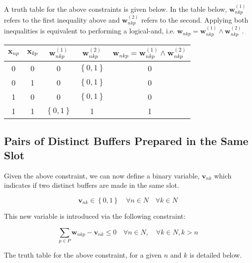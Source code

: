 A truth table for the above constraints is given below.
In the table below, $\boldsymbol{w}_{nkp}^{\left( 1 \right)}$ refers to the 
first inequality above and $\boldsymbol{w}_{nkp}^{\left( 2 \right)}$ refers to
the second.  Applying both inequalities is equivalent to performing a
logical-and, i.e. 
$\boldsymbol{w}_{nkp} = \boldsymbol{w}_{nkp}^{\left( 1 \right)} \land
\boldsymbol{w}_{nkp}^{\left( 2 \right)}$.

\begin{center}
    \begin{tabular}{c c | c c | c}
        $\boldsymbol{x}_{np}$ & $\boldsymbol{x}_{kp}$ & 
        $\boldsymbol{w}_{nkp}^{\left( 1 \right)}$ &
        $\boldsymbol{w}_{nkp}^{\left( 2 \right)}$ & 
        $\boldsymbol{w}_{nkp} = \boldsymbol{w}_{nkp}^{\left( 1 \right)}
            \land \boldsymbol{w}_{nkp}^{\left( 2 \right)}
        $\\ \hline
        0 & 0 & 0 & $\left\{ 0,1 \right\}$ & 0\\
        0 & 1 & 0 & $\left\{ 0,1 \right\}$ & 0\\
        1 & 0 & 0 & $\left\{ 0,1 \right\}$ & 0\\
        1 & 1 & $\left\{ 0,1 \right\}$ & 1 & 1\\
    \end{tabular}
\end{center}

\subsection{Pairs of Distinct Buffers Prepared in the Same Slot}\label{SS.constr7}

Given the above constraint, we can now define a binary variable, 
$ \boldsymbol{v}_{nk} $ which indicates if two distinct buffers are made in the
same slot.

\begin{equation}
    \boldsymbol{v}_{nk} \in \left\{ 0, 1 \right\} \quad \forall n \in N \quad
    \forall k \in N
    \label{eq.v}
\end{equation}

This new variable is introduced via the following constraint:

\begin{equation}
    \sum_{p \in P} \boldsymbol{w}_{nkp} - \boldsymbol{v}_{nk} \le 0 \quad
    \forall n \in N, \quad \forall k \in N, k > n
    \label{eq.constr7}
\end{equation}

The truth table for the above constraint, for a given $n$ and $k$ is detailed
 below.

